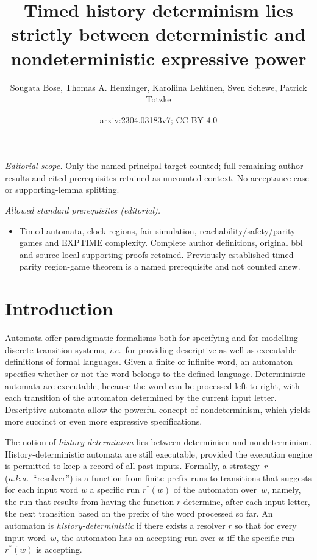 \documentclass[10pt,a4paper]{amsart}
\title{Timed history determinism lies strictly between deterministic and nondeterministic expressive power}
\author{Sougata Bose, Thomas A. Henzinger, Karoliina Lehtinen, Sven Schewe, Patrick Totzke}
\date{arxiv:2304.03183v7; CC BY 4.0}
\theoremstyle{definition}
\numberwithin{equation}{section}
\begin{document}
\maketitle
\noindent\textit{Editorial scope.} Only the named principal target counted; full remaining author results and cited prerequisites retained as uncounted context. No acceptance-case or supporting-lemma splitting.\par\medskip
\noindent\textit{Allowed standard prerequisites (editorial).}\begin{itemize}
\item Timed automata, clock regions, fair simulation, reachability/safety/parity games and EXPTIME complexity. Complete author definitions, original bbl and source-local supporting proofs retained. Previously established timed parity region-game theorem is a named prerequisite and not counted anew.
\end{itemize}\medskip
	\section{Introduction}
	\label{sec:intro}


Automata offer paradigmatic formalisms both for specifying and for modelling
discrete transition systems,
\emph{i.e.}~for providing descriptive as well as executable definitions of
formal languages.
Given a finite or infinite word, an automaton specifies whether or not the
word belongs to the defined language.
Deterministic automata are executable, because the word can be processed
left-to-right, with each transition of the automaton determined by
the current input letter.
Descriptive automata allow the powerful concept of nondeterminism, which
yields more succinct or even more expressive specifications.

The notion of \emph{history-determinism} lies between determinism and
nondeterminism.
History-deterministic automata are still executable, provided the execution
engine is permitted to keep a record of all past inputs. 
Formally, a strategy~$r$ (\emph{a.k.a.}~``resolver'') is a function from
finite prefix runs to transitions that suggests for each input word $w$
a specific run $r^*(w)$ of the automaton over~$w$,
namely, the run that results from having the function $r$ determine, after
each input letter, the next transition based on the prefix of the word
processed so far.
An automaton is \emph{history-deterministic} if there exists a resolver $r$
so that for every input word~$w$, the automaton has an accepting run over
$w$ iff the specific run $r^*(w)$ is accepting.
\end{document}
